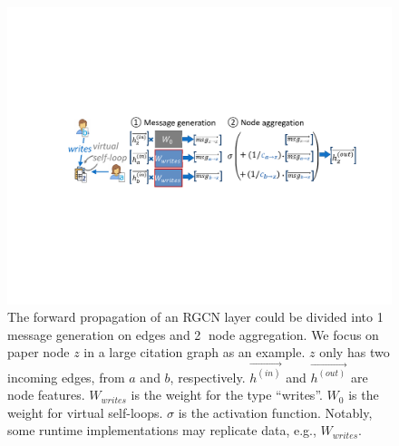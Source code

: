 \begin{figure}[!b]
\centering
\includegraphics[width=\linewidth]{figures/Hector/RGCN_v3.pdf}
\caption{\label{fig:rgnn_layer} The forward propagation of an RGCN layer could be divided into \textcircled{1} message generation on edges and \textcircled{2} node aggregation. We focus on paper node $z$ in a large citation graph as an example. $z$ only has two incoming edges, from $a$ and $b$, respectively. $\overrightarrow{{h}^{(in)}}$ and $\overrightarrow{{h}^{(out)}}$ are node features. $W_{writes}$ is the weight for the type ``writes''. $W_{0}$ is the weight for virtual self-loops. $\sigma$ is the activation function. Notably, some runtime implementations may replicate data, e.g., $W_{writes}$. }
\end{figure}


